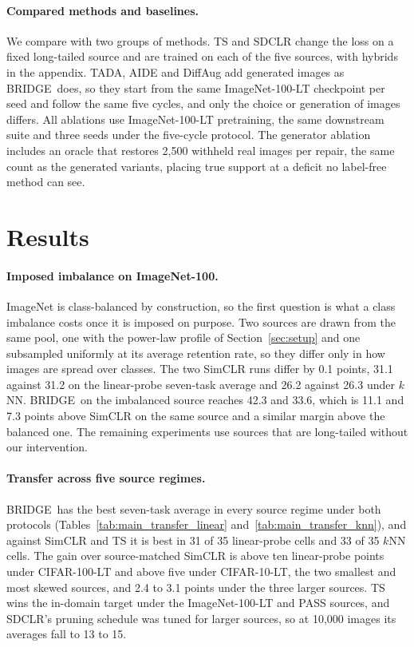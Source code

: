\documentclass{article}
\newcommand{\method}{BRIDGE}
\begin{document}
\paragraph{Compared methods and baselines.}
We compare with two groups of methods. TS and SDCLR change the loss on a fixed long-tailed source and are trained on each of the five sources, with hybrids in the appendix. TADA, AIDE and DiffAug add generated images as \method\ does, so they start from the same ImageNet-100-LT checkpoint per seed and follow the same five cycles, and only the choice or generation of images differs. All ablations use ImageNet-100-LT pretraining, the same downstream suite and three seeds under the five-cycle protocol. The generator ablation includes an oracle that restores 2{,}500 withheld real images per repair, the same count as the generated variants, placing true support at a deficit no label-free method can see.

\section{Results}
\label{sec:results}

\paragraph{Imposed imbalance on ImageNet-100.} ImageNet is class-balanced by construction, so the first question is what a class imbalance costs once it is imposed on purpose. Two sources are drawn from the same pool, one with the power-law profile of Section~\ref{sec:setup} and one subsampled uniformly at its average retention rate, so they differ only in how images are spread over classes. The two SimCLR runs differ by 0.1 points, 31.1 against 31.2 on the linear-probe seven-task average and 26.2 against 26.3 under $k$NN. \method\ on the imbalanced source reaches 42.3 and 33.6, which is 11.1 and 7.3 points above SimCLR on the same source and a similar margin above the balanced one. The remaining experiments use sources that are long-tailed without our intervention.



\paragraph{Transfer across five source regimes.} \method\ has the best seven-task average in every source regime under both protocols (Tables~\ref{tab:main_transfer_linear} and~\ref{tab:main_transfer_knn}), and against SimCLR and TS it is best in 31 of 35 linear-probe cells and 33 of 35 $k$NN cells. The gain over source-matched SimCLR is above ten linear-probe points under CIFAR-100-LT and above five under CIFAR-10-LT, the two smallest and most skewed sources, and 2.4 to 3.1 points under the three larger sources. TS wins the in-domain target under the ImageNet-100-LT and PASS sources, and SDCLR's pruning schedule was tuned for larger sources, so at 10{,}000 images its averages fall to 13 to 15.
\end{document}
